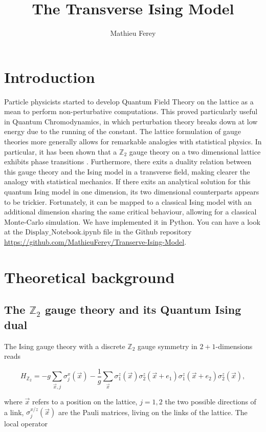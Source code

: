 \documentclass[11pt,openany]{article}
\title{The Transverse Ising Model }
\author{Mathieu Ferey}
\begin{document}
	


\tableofcontents\clearpage

\section{Introduction}

Particle physicists started to develop Quantum Field Theory on the lattice as a mean to perform non-perturbative computations. This proved particularly useful in Quantum Chromodynamics, in which perturbation theory breaks down at low energy due to the running of the constant. The lattice formulation of gauge theories more generally allows for remarkable analogies with statistical physics. In particular, it has been shown that a $\mathds{Z}_2$ gauge theory on a two dimensional lattice exhibits phase transitions \cite{Wegner}. Furthermore, there exits a duality relation between this gauge theory and the Ising model in a transverse field, making clearer the analogy with statistical mechanics. If there exits an analytical solution for this quantum Ising model in one dimension, its two dimensional counterparts appears to be trickier. Fortunately, it can be mapped to a classical Ising model with an additional dimension sharing the same critical behaviour, allowing for a classical Monte-Carlo simulation. We have implemented it in Python. You can have a look at the $\mathrm{Display\_Notebook.ipynb}$ file in the Github repository \url{https://github.com/MathieuFerey/Transerve-Ising-Model}.

\section{Theoretical background}

\subsection{The $\mathds{Z}_2$ gauge theory and its Quantum Ising dual}

The Ising gauge theory with a discrete $\mathds{Z}_2$ gauge symmetry in $2+1$-dimensions \cite{fradkin} reads

\begin{equation}
	H_{\mathds{Z}_2} = -g\sum_{\vec{x},j}\sigma^x_j(\vec{x}) - \frac{1}{g}\sum_{\vec{x}}\sigma_1^z(\vec{x})\sigma_2^z(\vec{x}+e_1)\sigma_1^z(\vec{x}+e_2)\sigma_2^z(\vec{x}),
\end{equation}

where $\vec{x}$ refers to a position on the lattice, $j=1,2$ the two possible directions of a link, $\sigma_j^{x/z}(\vec{x})$ are the Pauli matrices, living on the links of the lattice. The local operator
\end{document}
